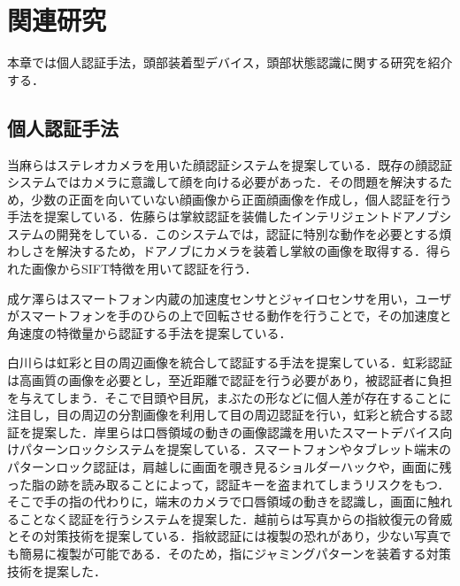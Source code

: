 \documentclass[Japanese,noauthor]{dicomopapers}
\begin{document}
\section{関連研究}
\label{related}
本章では個人認証手法，頭部装着型デバイス，頭部状態認識に関する研究を紹介する．
\subsection{個人認証手法}
当麻ら\cite{face}はステレオカメラを用いた顔認証システムを提案している．既存の顔認証システムではカメラに意識して顔を向ける必要があった．その問題を解決するため，少数の正面を向いていない顔画像から正面顔画像を作成し，個人認証を行う手法を提案している．佐藤ら\cite{door}は掌紋認証を装備したインテリジェントドアノブシステムの開発をしている．このシステムでは，認証に特別な動作を必要とする煩わしさを解決するため，ドアノブにカメラを装着し掌紋の画像を取得する．得られた画像からSIFT特徴を用いて認証を行う．\par

成ケ澤ら\cite{acceleration}はスマートフォン内蔵の加速度センサとジャイロセンサを用い，ユーザがスマートフォンを手のひらの上で回転させる動作を行うことで，その加速度と角速度の特徴量から認証する手法を提案している．\par

白川ら\cite{iris_eye}は虹彩と目の周辺画像を統合して認証する手法を提案している．虹彩認証は高画質の画像を必要とし，至近距離で認証を行う必要があり，被認証者に負担を与えてしまう．そこで目頭や目尻，まぶたの形などに個人差が存在することに注目し，目の周辺の分割画像を利用して目の周辺認証を行い，虹彩と統合する認証を提案した．岸里ら\cite{mouth_pattern}は口唇領域の動きの画像認識を用いたスマートデバイス向けパターンロックシステムを提案している．スマートフォンやタブレット端末のパターンロック認証は，肩越しに画面を覗き見るショルダーハックや，画面に残った脂の跡を読み取ることによって，認証キーを盗まれてしまうリスクをもつ．そこで手の指の代わりに，端末のカメラで口唇領域の動きを認識し，画面に触れることなく認証を行うシステムを提案した．越前ら\cite{finger_print}は写真からの指紋復元の脅威とその対策技術を提案している．指紋認証には複製の恐れがあり，少ない写真でも簡易に複製が可能である．そのため，指にジャミングパターンを装着する対策技術を提案した．\par
\end{document}
